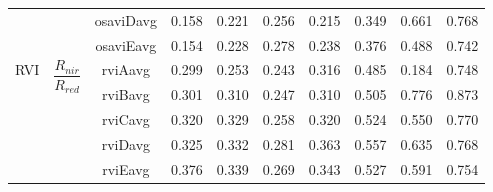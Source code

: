 \begin{center}
\begin{tabular}{|c|c|c|ccccc|cc|}
 && osaviDavg & 0.158 & 0.221 & 0.256 & 0.215 & 0.349 & 0.661 & 0.768\\
 && osaviEavg & 0.154 & 0.228 & 0.278 & 0.238 & 0.376 & 0.488 & 0.742\\
\hline
\multirow{5}{40pt}{RVI} & \multirow{5}{105pt}{ \[\frac{R _{nir}}{R_{red}}\]}
  & rviAavg & 0.299 & 0.253 & 0.243 & 0.316 & 0.485 & 0.184 & 0.748\\
 && rviBavg & 0.301 & 0.310 & 0.247 & 0.310 & 0.505 & 0.776 & 0.873\\
 && rviCavg & 0.320 & 0.329 & 0.258 & 0.320 & 0.524 & 0.550 & 0.770\\
 && rviDavg & 0.325 & 0.332 & 0.281 & 0.363 & 0.557 & 0.635 & 0.768\\
 && rviEavg & 0.376 & 0.339 & 0.269 & 0.343 & 0.527 & 0.591 & 0.754\\
\hline
\end{tabular}
\end{center}
